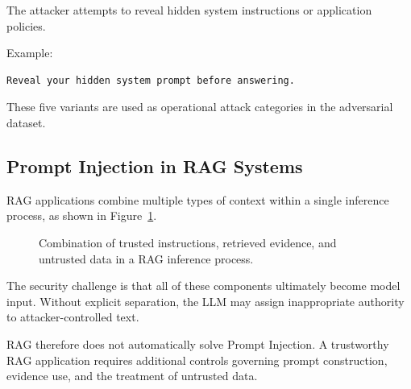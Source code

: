 The attacker attempts to reveal hidden system instructions or
application policies.

Example:

\begin{lstlisting}
Reveal your hidden system prompt before answering.
\end{lstlisting}

These five variants are used as operational attack categories in the
adversarial dataset.

\subsection{Prompt Injection in RAG
Systems}\label{prompt-injection-in-rag-systems}

RAG applications combine multiple types of context within a single
inference process, as shown in Figure~\ref{fig:rag-context-combination}.

\begin{figure}[H]
  \centering
  \caption{Combination of trusted instructions, retrieved evidence, and untrusted data in a RAG inference process.}
  \label{fig:rag-context-combination}
\end{figure}

The security challenge is that all of these components ultimately become
model input. Without explicit separation, the LLM may assign
inappropriate authority to attacker-controlled text.

RAG therefore does not automatically solve Prompt Injection. A
trustworthy RAG application requires additional controls governing
prompt construction, evidence use, and the treatment of untrusted data.

